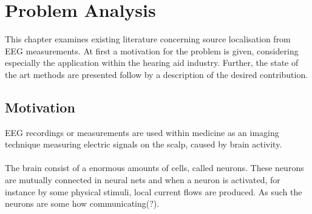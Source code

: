 \chapter{Problem Analysis}
This chapter examines existing literature concerning source localisation from EEG measurements. At first a motivation for the problem is given, considering especially the application within the hearing aid industry. Further, the state of the art methods are presented follow by a description of the desired contribution. 

\section{Motivation}
EEG recordings or measurements are used within medicine as an imaging technique measuring electric signals on the scalp, caused by brain activity. \\
\\
The brain consist of a enormous amounts of cells, called neurons. These neurons are mutually connected in neural nets and when a neuron is activated, for instance by some physical stimuli, local current flows are produced. As such the neurons are some how communicating(?). \\
\\
